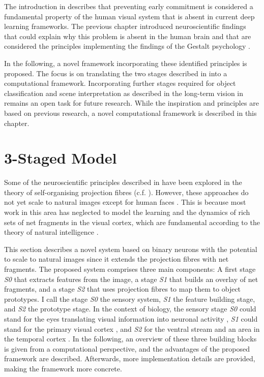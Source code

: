The introduction in  describes that preventing early commitment \cite{marr_vision_2010} is considered a fundamental property of the human visual system that is absent in current deep learning frameworks.
The previous chapter introduced neuroscientific findings that could explain why this problem is absent in the human brain and that are considered the principles implementing the findings of the Gestalt psychology \cite{ellis_source_1938, kohler_gestalt_1992, wagemans_century_2012, hamlyn_psychology_2017}.

In the following, a novel framework incorporating these identified principles is proposed.
The focus is on translating the two stages described in  into a computational framework.
Incorporating further stages required for object classification and scene interpretation as described in the long-term vision in  remains an open task for future research.
While the inspiration and principles are based on previous research, a novel computational framework is described in this chapter.

\section{3-Staged Model}
Some of the neuroscientific principles described in  have been explored in the theory of self-organising projection fibres  (c.f. ). However, these approaches do not yet scale to natural images except for human faces . This is because most work in this area has neglected to model the learning and the dynamics of rich sets of net fragments in the visual cortex, which are fundamental according to the theory of natural intelligence .

This section describes a novel system based on binary neurons with the potential to scale to natural images since it extends the projection fibres with net fragments.
The proposed system comprises three main components: A first stage \emph{S0} that extracts features from the image, a stage \emph{S1} that builds an overlay of net fragments, and a stage \emph{S2} that uses projection fibres to map them to object prototypes.
I call the stage \emph{S0} the sensory system, \emph{S1} the feature building stage, and \emph{S2} the prototype stage.
In the context of biology, the sensory stage \emph{S0} could stand for the eyes translating visual information into neuronal activity , \emph{S1} could stand for the primary visual cortex , and \emph{S2} for the ventral stream  and an area in the temporal cortex \cite{miyashita_inferior_1993}.
In the following, an overview of these three building blocks is given from a computational perspective, and the advantages of the proposed framework are described.
Afterwards, more implementation details are provided, making the framework more concrete.

